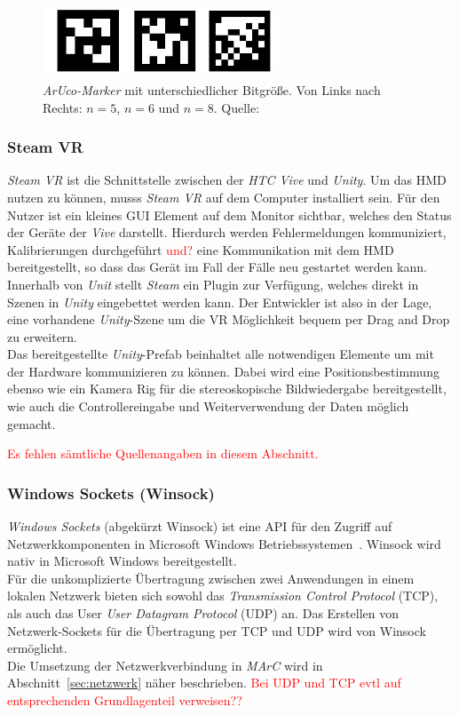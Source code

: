 \begin{figure}[H] 
	\center 
	\includegraphics[width=7cm]{Bilder/VerschAruco.jpg}			
	\caption{\textit{ArUco-Marker} mit unterschiedlicher Bitgröße. Von Links nach Rechts: $n=5$, $n=6$ und $n=8$. Quelle: \cite{article:Aruco2014}}
	\label{fig:SizesArucoMarker}
\end{figure}

\subsubsection{Steam VR}
\textit{Steam VR} ist die Schnittstelle zwischen der \textit{HTC Vive} und \textit{Unity}. Um das HMD nutzen zu können, musss \textit{Steam VR} auf dem Computer installiert sein. Für den Nutzer ist ein kleines GUI Element auf dem Monitor sichtbar, welches den Status der Geräte der \textit{Vive} darstellt. Hierdurch werden Fehlermeldungen kommuniziert, Kalibrierungen durchgeführt \textcolor{red}{und?} eine Kommunikation mit dem HMD bereitgestellt, so dass das Gerät im Fall der Fälle neu gestartet werden kann.\\
Innerhalb von \textit{Unit} stellt \textit{Steam} ein Plugin zur Verfügung, welches direkt in Szenen in \textit{Unity} eingebettet werden kann. Der Entwickler ist also in der Lage, eine vorhandene \textit{Unity}-Szene um die VR Möglichkeit bequem per Drag and Drop zu erweitern.\\
Das bereitgestellte \textit{Unity}-Prefab beinhaltet alle notwendigen Elemente um mit der Hardware kommunizieren zu können. Dabei wird eine Positionsbestimmung ebenso wie ein Kamera Rig für die stereoskopische Bildwiedergabe bereitgestellt, wie auch die Controllereingabe und Weiterverwendung der Daten möglich gemacht.

\textcolor{red}{Es fehlen sämtliche Quellenangaben in diesem Abschnitt.}


\subsubsection{Windows Sockets (Winsock)}\label{sec:Winsock}
\textit{Windows Sockets} (abgekürzt Winsock) ist eine API für den Zugriff auf Netzwerkkomponenten in Microsoft Windows Betriebssystemen~\cite{quinn1998windows}. Winsock wird nativ in Microsoft Windows bereitgestellt.\\ 
Für die unkomplizierte Übertragung zwischen zwei Anwendungen in einem lokalen Netzwerk bieten sich sowohl das \emph{Transmission Control Protocol} (TCP), als auch das User \emph{User Datagram Protocol} (UDP) an. Das Erstellen von Netzwerk-Sockets für die Übertragung per TCP und UDP wird von Winsock ermöglicht.\\ Die Umsetzung der Netzwerkverbindung in \emph{MArC} wird in Abschnitt~\ref{sec:netzwerk} näher beschrieben. \textcolor{red}{Bei UDP und TCP evtl auf entsprechenden Grundlagenteil verweisen??}


